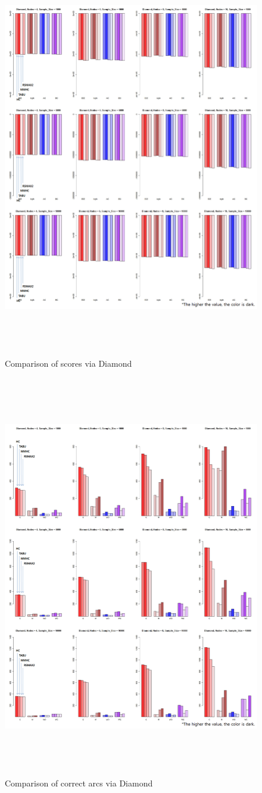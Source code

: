 	\begin{figure}[p]
	\centering
		\includegraphics[height=500pt]{05_Diamond_Score}
		\caption{Comparison of scores via Diamond}
	\end{figure}	

	\begin{figure}[p]
	\centering
		\includegraphics[height=500pt]{05_Diamond_Arcs}
		\caption{Comparison of correct arcs via Diamond}
	\end{figure}	
	